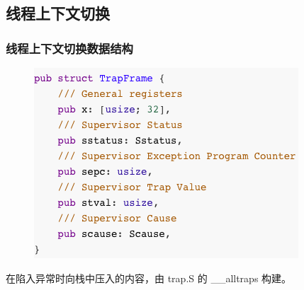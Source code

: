 \subsection{线程上下文切换} %
\begin{frame}[fragile]
    \frametitle{线程上下文切换数据结构}
    \begin{figure}
    \includegraphics[width=0.6\linewidth]{figs/struct-TrapFrame.png}
    \end{figure}

在陷入异常时向栈中压入的内容，由 trap.S 的 \_\_alltraps 构建。

\end{frame}

% 
% 
% 
% 
% 
% 
% 
% 

